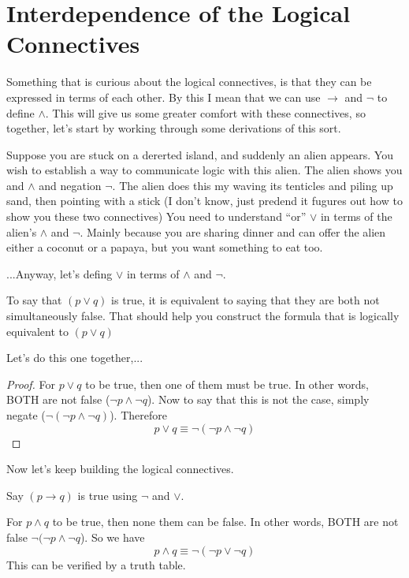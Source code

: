 \section{Interdependence of the Logical Connectives}
Something that is curious about the logical connectives, is that they can be expressed in terms of each other.  By this I mean that we can use $\rightarrow$ and $\neg$ to define $\land$.  This will give us some greater comfort with these connectives, so together, let's start by working through some derivations of this sort. 

\begin{example}
Suppose you are stuck on a dererted island, and suddenly an alien appears.  You wish to establish a way to communicate logic with this alien.  The alien shows you and $\land$ and negation $\neg$. The alien does this my waving its tenticles and piling up sand, then pointing with a stick (I don't know, just predend it fugures out how to show you these two connectives) You need to understand ``or''  $\lor$ in terms of the alien's $\land$ and $\neg$.  Mainly because you are sharing dinner and can offer the alien either a coconut or a papaya, but you want something to eat too.

...Anyway, let's defing $\lor$ in terms of $\land$ and $\neg$.
\end{example}

\begin{problem}
To say that $(p \lor q)$ is true, it is equivalent to saying that they are both not simultaneously false. That should help you construct the formula that is logically equivalent to $(p \lor q)$

Let's do this one together,...
\begin{proof}
For $p\lor q$ to be true, then one of them must be true.  In other words, BOTH are not false ($\neg p \land \neg q$). Now to say that this is not the case, simply negate ($\neg (\neg p \land \neg q)$). Therefore
$$p \lor q \equiv \neg (\neg p \land \neg q)$$
\end{proof}
\end{problem}

Now let's keep building the logical connectives.
\begin{problem}
Say $(p \rightarrow q)$ is true using $\neg$ and $\lor$.

\ifKey
\color{red}
\hfill \begin{minipage}{0.5\textwidth}
For $p\land q$ to be true, then none them can be false.  In other words, BOTH are not false $\neg (\neg p \land \neg q$). So we have
$$p \land q \equiv \neg (\neg p \lor \neg q)$$
This can be verified by a truth table.
\end{minipage}
\color{black}
\fi
\end{problem}

